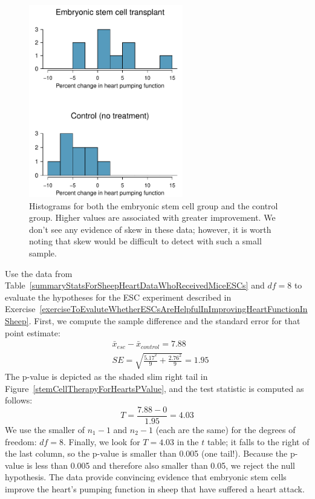 \begin{figure}
\centering
\includegraphics[width=0.6\textwidth]{05/figures/stemCellTherapyForHearts/stemCellTherapyForHearts}
\caption{Histograms for both the embryonic stem cell group and the control group. Higher values are associated with greater improvement. We don't see any evidence of skew in these data; however, it is worth noting that skew would be difficult to detect with such a small sample.}
\label{stemCellTherapyForHearts}
\end{figure}

\begin{example}{Use the data from Table~\ref{summaryStatsForSheepHeartDataWhoReceivedMiceESCs} and $df=8$ to evaluate the hypotheses for the ESC experiment described in Exercise~\ref{exerciseToEvaluteWhetherESCsAreHelpfulInImprovingHeartFunctionInSheep}.}
First, we compute the sample difference and the standard error for that point estimate:
\begin{align*}
& \bar{x}_{esc} - \bar{x}_{control} = 7.88 \\
& SE = \sqrt{\frac{5.17^2}{9} + \frac{2.76^2}{9}} = 1.95
\end{align*}
The p-value is depicted as the shaded slim right tail in Figure~\ref{stemCellTherapyForHeartsPValue}, and the test statistic is computed as follows:
$$T = \frac{7.88 - 0}{1.95} = 4.03$$
We use the smaller of $n_1-1$ and $n_2-1$ (each are the same) for the degrees of freedom: $df=8$. Finally, we look for $T=4.03$ in the $t$ table; it falls to the right of the last column, so the p-value is smaller than 0.005 (one tail!). Because the p-value is less than 0.005 and therefore also smaller than 0.05, we reject the null hypothesis. The data provide convincing evidence that embryonic stem cells improve the heart's pumping function in sheep that have suffered a heart attack.
\end{example}

